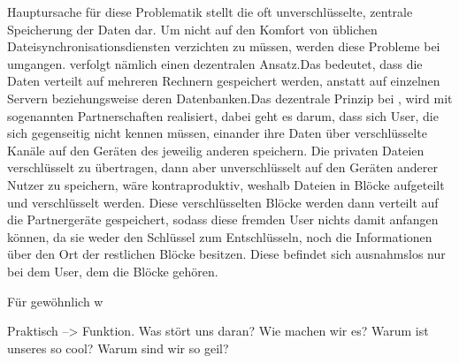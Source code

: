 Hauptursache für diese Problematik stellt die oft unverschlüsselte, zentrale
Speicherung der Daten dar. Um nicht auf den Komfort von üblichen
Dateisynchronisationsdiensten verzichten zu müssen, werden diese Probleme bei
\sblit umgangen. \sblitg verfolgt nämlich einen dezentralen Ansatz.Das bedeutet,
dass die Daten verteilt auf mehreren Rechnern gespeichert werden, anstatt auf
einzelnen Servern beziehungsweise deren Datenbanken.Das dezentrale Prinzip bei
\sblit, wird mit sogenannten Partnerschaften realisiert, dabei geht es darum,
dass sich User, die sich gegenseitig nicht kennen müssen, einander ihre Daten
über verschlüsselte Kanäle auf den Geräten des jeweilig anderen speichern. Die
privaten Dateien verschlüsselt zu übertragen, dann aber unverschlüsselt auf den
Geräten anderer Nutzer zu speichern, wäre kontraproduktiv, weshalb Dateien in
Blöcke aufgeteilt und verschlüsselt werden. Diese verschlüsselten Blöcke werden
dann verteilt auf die Partnergeräte gespeichert, sodass diese fremden User
nichts damit anfangen können, da sie weder den Schlüssel zum Entschlüsseln,
noch die Informationen über den Ort der restlichen Blöcke besitzen. Diese
befindet sich ausnahmslos nur bei dem User, dem die Blöcke gehören.

Für gewöhnlich w





Praktisch --> Funktion.
Was stört uns daran?
Wie machen wir es?
Warum ist unseres so cool?
Warum sind wir so geil?
